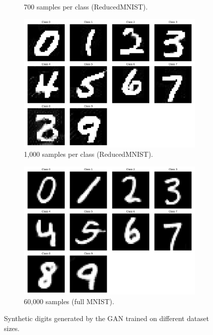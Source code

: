 \documentclass[12pt]{article}
\begin{document}
\begin{figure}[h]
\begin{subfigure}[t]{0.45\textwidth}
        \caption{700 samples per class (ReducedMNIST).}
        \label{fig:gan_output_700_sub}
    \end{subfigure}

    \vspace{1em}

    \begin{subfigure}[t]{0.45\textwidth}
        \centering
        \includegraphics[width=\textwidth]{1000_GAN_output.png}
        \caption{1,000 samples per class (ReducedMNIST).}
        \label{fig:gan_output_1000_sub}
    \end{subfigure}
    \hfill
    \begin{subfigure}[t]{0.45\textwidth}
        \centering
        \includegraphics[width=\textwidth]{60000_MNIST_GAN_output.png}
        \caption{60,000 samples (full MNIST).}
        \label{fig:gan_output_60000_sub}
    \end{subfigure}
    \caption{Synthetic digits generated by the GAN trained on different dataset sizes.}
    \label{fig:gan_outputs}
\end{figure}
\end{document}
